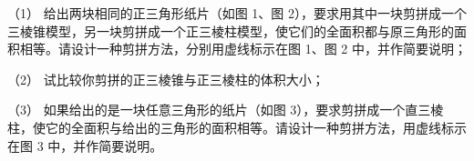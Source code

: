 \begin{question}

（1） 给出两块相同的正三角形纸片（如图 1、图 2），要求用其中一块剪拼成一个三棱锥模型，另一块剪拼成一个正三棱柱模型，使它们的全面积都与原三角形的面积相等。请设计一种剪拼方法，分别用虚线标示在图 1、图 2 中，并作简要说明；

（2） 试比较你剪拼的正三棱锥与正三棱柱的体积大小；

（3） 如果给出的是一块任意三角形的纸片（如图 3），要求剪拼成一个直三棱柱，使它的全面积与给出的三角形的面积相等。请设计一种剪拼方法，用虚线标示在图 3 中，并作简要说明。
\nopagebreak[4]
\begin{center}\end{center}
\nopagebreak[4]

\end{question}